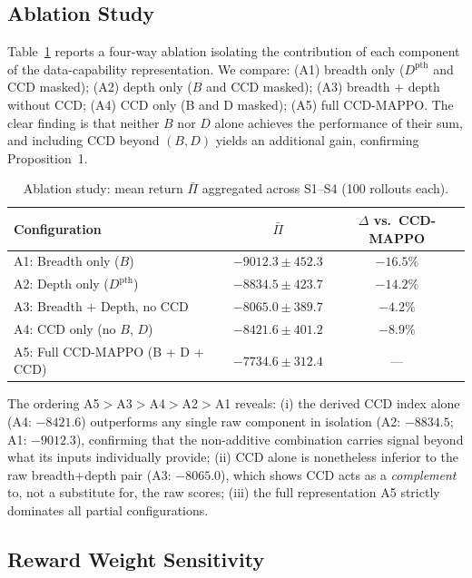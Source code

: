 \documentclass[11pt,a4paper]{article}
\theoremstyle{plain}
\theoremstyle{definition}
\begin{document}
\subsection{Ablation Study}
\label{sec:ablation}

Table~\ref{tab:ablation} reports a four-way ablation isolating the contribution of each
component of the data-capability representation.  We compare: (A1) breadth only
($D^{\mathrm{pth}}$ and CCD masked); (A2) depth only ($B$ and CCD masked); (A3) breadth
$+$ depth without CCD; (A4) CCD only (B and D masked); (A5) full CCD-MAPPO.  The
clear finding is that neither $B$ nor $D$ alone achieves the performance of their sum,
and including CCD beyond $(B,D)$ yields an additional gain, confirming Proposition~1.

\begin{table}[t]
\centering
\caption{Ablation study: mean return $\bar\Pi$ aggregated across S1--S4 (100 rollouts each).}
\label{tab:ablation}
\begin{tabular}{lcc}
\toprule
Configuration & $\bar\Pi$ & $\Delta$ vs.\ CCD-MAPPO \\
\midrule
A1: Breadth only ($B$)           & $-9012.3\pm452.3$ & $-16.5\%$ \\
A2: Depth only ($D^{\mathrm{pth}}$) & $-8834.5\pm423.7$ & $-14.2\%$ \\
A3: Breadth + Depth, no CCD      & $-8065.0\pm389.7$ & $-4.2\%$  \\
A4: CCD only (no $B$, $D$)       & $-8421.6\pm401.2$ & $-8.9\%$  \\
A5: Full CCD-MAPPO (B + D + CCD) & $-7734.6\pm312.4$ & ---       \\
\bottomrule
\end{tabular}
\end{table}

The ordering A5$>$A3$>$A4$>$A2$>$A1 reveals: (i) the derived CCD index alone (A4:
$-8421.6$) outperforms any single raw component in isolation (A2: $-8834.5$; A1:
$-9012.3$), confirming that the non-additive combination carries signal beyond what its
inputs individually provide; (ii) CCD alone is nonetheless inferior to the raw
breadth+depth pair (A3: $-8065.0$), which shows CCD acts as a \emph{complement} to,
not a substitute for, the raw scores; (iii) the full representation A5 strictly dominates
all partial configurations.

\subsection{Reward Weight Sensitivity}
\label{sec:sensitivity}
\end{document}
